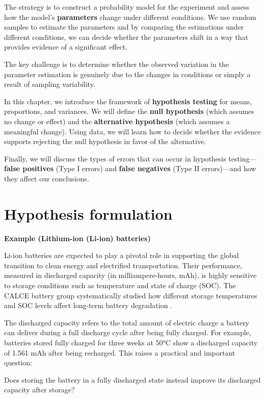 \documentclass[
]{book}
\begin{document}
The strategy is to construct a probability model for the experiment and assess how the model's \textbf{parameters} change under different conditions. We use random samples to estimate the parameters and by comparing the estimations under different conditions, we can decide whether the parameters shift in a way that provides evidence of a significant effect.

The key challenge is to determine whether the observed variation in the parameter estimation is genuinely due to the changes in conditions or simply a result of sampling variability.

In this chapter, we introduce the framework of \textbf{hypothesis testing} for means, proportions, and variances. We will define the \textbf{null hypothesis} (which assumes no change or effect) and the \textbf{alternative hypothesis} (which assumes a meaningful change). Using data, we will learn how to decide whether the evidence supports rejecting the null hypothesis in favor of the alternative.

Finally, we will discuss the types of errors that can occur in hypothesis testing---\textbf{false positives} (Type I errors) and \textbf{false negatives} (Type II errors)---and how they affect our conclusions.

\hypertarget{hypothesis-formulation}{%
\section{Hypothesis formulation}\label{hypothesis-formulation}}

\textbf{Example (Lithium-ion (Li-ion) batteries)}

Li-ion batteries are expected to play a pivotal role in supporting the global transition to clean energy and electrified transportation. Their performance, measured in discharged capacity (in milliampere-hours, mAh), is highly sensitive to storage conditions such as temperature and state of charge (SOC). The CALCE battery group systematically studied how different storage temperatures and SOC levels affect long-term battery degradation \citep{CALCE_StorageData2025}.

The discharged capacity refers to the total amount of electric charge a battery can deliver during a full discharge cycle after being fully charged. For example, batteries stored fully charged for three weeks at 50°C show a discharged capacity of 1.561 mAh after being recharged. This raises a practical and important question:

Does storing the battery in a fully discharged state instead improve its discharged capacity after storage?
\end{document}
